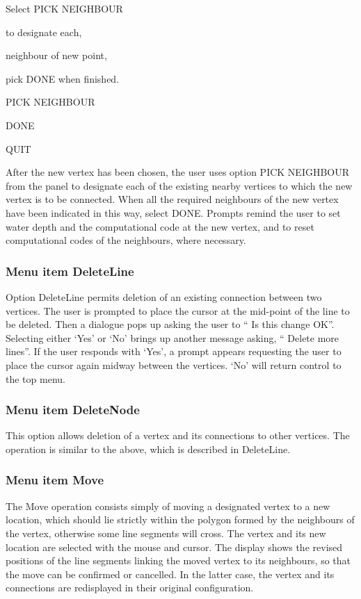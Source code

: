 \documentclass{article}
\begin{document}
Select PICK NEIGHBOUR 

to designate each, 

neighbour of new point, 

pick DONE when finished.\newline

PICK NEIGHBOUR \newline

DONE \newline

QUIT

After the new vertex has been chosen, the user uses option PICK NEIGHBOUR from the panel to designate each of the existing nearby vertices to which the new vertex is to be connected. When all the required neighbours of the new vertex have been indicated in this way, select DONE. Prompts remind the user to set water depth and the computational code at the new vertex, and to reset computational codes of the neighbours, where necessary.

\subsubsection[Menu item DeleteLine]{Menu item DeleteLine}
Option DeleteLine permits deletion of an existing connection between two vertices. The user is prompted to place the cursor at the mid-point of the line to be deleted. Then a dialogue pops up asking the user to `` Is this change OK''. Selecting either `Yes' or `No' brings up another message asking, `` Delete more lines''. If the user responds with `Yes', a prompt appears requesting the user to place the cursor again midway between the vertices. `No' will return control to the top menu.

\subsubsection[Menu item DeleteNode]{Menu item DeleteNode}
This option allows deletion of a vertex and its connections to other vertices. The operation is similar to the above, which is described in DeleteLine. 

\subsubsection[Menu item Move]{Menu item Move}
The Move operation consists simply of moving a designated vertex to a new location, which should lie strictly within the polygon formed by the neighbours of the vertex, otherwise some line segments will cross. The vertex and its new location are selected with the mouse and cursor. The display shows the revised positions of the line segments linking the moved vertex to its neighbours, so that the move can be confirmed or cancelled. In the latter case, the vertex and its connections are redisplayed in their original configuration. 
\end{document}
